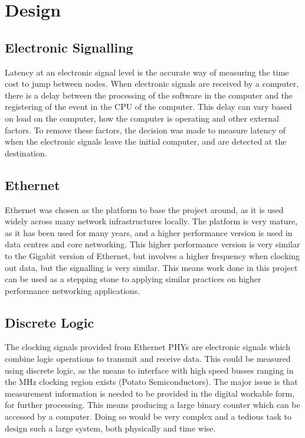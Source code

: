 \chapter{Design}\label{C:design}

\section{Electronic Signalling}

\par Latency at an electronic signal level is the accurate way of measuring the time cost to jump between nodes. 
When electronic signals are received by a computer, there is a delay between the processing of the software 
in the computer and the registering of the event in the CPU of the computer. This delay can vary based on load 
on the computer, how the computer is operating and other external factors. To remove these factors, the decision 
was made to measure latency of when the electronic signals leave the initial computer, and are detected at the 
destination.

\section{Ethernet}

\par Ethernet was chosen as the platform to base the project around, as it is used widely across many network 
infrastructures locally. The platform is very mature, as it has been used for many years, and a higher performance 
version is used in data centres and core networking. This higher performance version is very similar to the Gigabit 
version of Ethernet, but involves a higher frequency when clocking out data, but the signalling is very similar. 
This means work done in this project can be used as a stepping stone to applying similar practices on higher 
performance networking applications.

\section{Discrete Logic}

\par The clocking signals provided from Ethernet PHYs are electronic signals which combine logic operations to transmit 
and receive data. This could be measured using discrete logic, as the means to interface with high speed busses 
ranging in the MHz clocking region exists (Potato Semiconductors). The major issue is that measurement information 
is needed to be provided in the digital workable form, for further processing.  This means producing a large binary 
counter which can be accessed by a computer. Doing so would be very complex and a tedious task to design such a 
large system, both physically and time wise.

